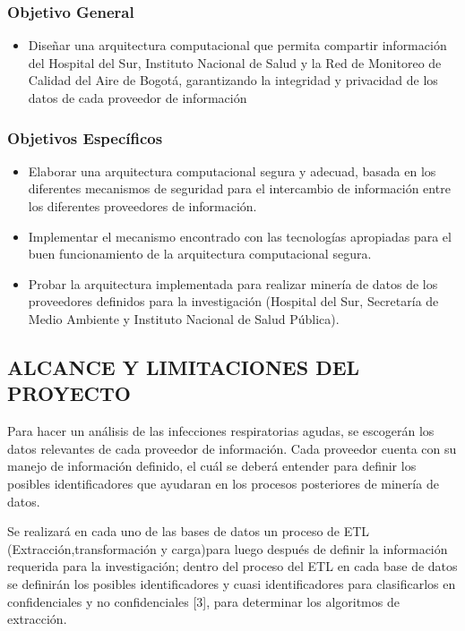 \documentclass[a4paper, 11pt, oneside]{article}
\theoremstyle{definition}
\theoremstyle{remark}
\begin{document}
\subsubsection{Objetivo General}
\begin{itemize}
\item Diseñar una arquitectura computacional que permita compartir información del Hospital del Sur, Instituto Nacional de Salud y la Red de Monitoreo de Calidad del Aire de Bogotá, garantizando la integridad y privacidad de los datos de cada proveedor de información
\end{itemize}

\subsubsection{Objetivos Específicos}
\begin{itemize}
\item Elaborar una arquitectura computacional segura y adecuad, basada en los diferentes mecanismos de seguridad para el intercambio de información entre los diferentes proveedores de información.
\item Implementar el mecanismo encontrado con las tecnologías apropiadas para el buen funcionamiento de la arquitectura computacional segura.
\item Probar la arquitectura implementada para realizar minería de datos de los proveedores definidos para la investigación (Hospital del Sur, Secretaría de Medio Ambiente y Instituto Nacional de Salud Pública).

\end{itemize}

\subsection{ALCANCE Y LIMITACIONES DEL PROYECTO}

Para hacer un análisis de las infecciones respiratorias agudas, se escogerán los datos relevantes de cada proveedor de información. Cada proveedor cuenta con su  manejo de información definido, el cuál se deberá entender para definir los posibles identificadores que ayudaran en los procesos posteriores de minería de datos. 

Se realizará en cada uno de las bases de datos un proceso de ETL (Extracción,transformación y carga)para luego después de definir la información requerida para la investigación; dentro del proceso del ETL en cada base de datos se definirán los posibles identificadores y cuasi identificadores para clasificarlos en confidenciales y no confidenciales [3], para determinar los algoritmos de extracción.
\end{document}
